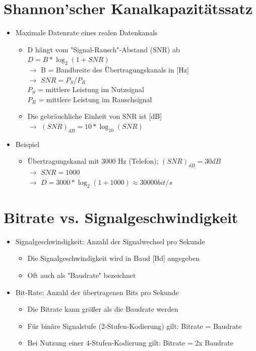 \documentclass{scrreprt}
\begin{document}
\section{Shannon'scher Kanalkapazitätssatz}
\begin{itemize}
	\item Maximale Datenrate eines realen Datenkanals
	      \begin{itemize}
		      \item D hängt vom "Signal-Rausch"-Abstand (SNR) ab
		            \\$D=B*\log_{2}(1+SNR)$
			            \\$\rightarrow$ B = Bandbreite des Übertragungskanals in [Hz]
		            \\$\rightarrow$ $SNR = P_{S}/P_{R}$
			            \\$P_{S}$ = mittlere Leistung im Nutzsignal
		            \\$P_{R}$ = mittlere Leistung im Rauschsignal
		      \item Die gebräuchliche Einheit von SNR ist [dB]
		            \\$\rightarrow$ $(SNR)_{dB} = 10*\log_{10}(SNR)$
	      \end{itemize}
	\item Beispiel
	      \begin{itemize}
		      \item Übertragungskanal mit 3000 Hz (Telefon); $(SNR)_{dB} = 30dB$
		            \\$\rightarrow$ $SNR = 1000$
			            \\$\rightarrow$ $D = 3000*\log_{2}(1+1000) \approx 30000bit/s$
	      \end{itemize}
\end{itemize}

\section{Bitrate vs. Signalgeschwindigkeit}
\begin{itemize}
	\item Signalgeschwindigkeit: Anzahl der Signalwechsel pro Sekunde
	      \begin{itemize}
		      \item Die Signalgeschwindigkeit wird in Baud [Bd] angegeben
		      \item Oft auch als "Baudrate" bezeichnet
	      \end{itemize}
	\item Bit-Rate: Anzahl der übertragenen Bits pro Sekunde
	      \begin{itemize}
		      \item Die Bitrate kann größer als die Baudrate werden
		      \item Für binäre Signalstufe (2-Stufen-Kodierung) gilt: Bitrate = Baudrate
		      \item Bei Nutzung einer 4-Stufen-Kodierung gilt: Bitrate = 2x Baudrate
	      \end{itemize}
\end{itemize}
\end{document}
